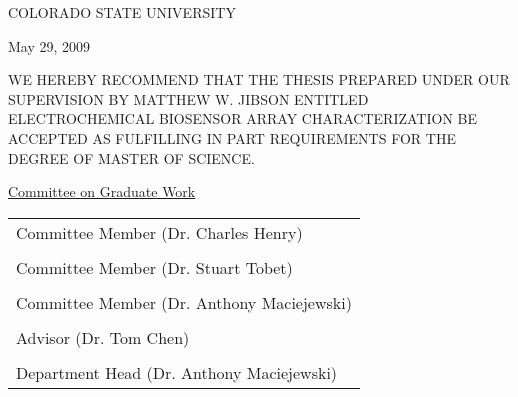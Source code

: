 \begin{center}
	COLORADO STATE UNIVERSITY
\end{center}

\vspace{0.5in}

\begin{flushright}
	May 29, 2009
\end{flushright}

WE HEREBY RECOMMEND THAT THE THESIS PREPARED UNDER OUR SUPERVISION BY MATTHEW W. JIBSON ENTITLED ELECTROCHEMICAL BIOSENSOR ARRAY CHARACTERIZATION BE ACCEPTED AS FULFILLING IN PART REQUIREMENTS FOR THE DEGREE OF MASTER OF SCIENCE.

\vspace{0.5in}

\begin{center}
	\underline{Committee on Graduate Work}\\

	\vspace{0.5in}

	\begin{tabular}{p{3in}}
		\\
		\hline Committee Member (Dr. Charles Henry)\\
		\\
		\hline Committee Member (Dr. Stuart Tobet)\\
		\\
		\hline Committee Member (Dr. Anthony Maciejewski)\\
		\\
		\hline Advisor (Dr. Tom Chen)\\
		\\
		\hline Department Head (Dr. Anthony Maciejewski)
	\end{tabular}
\end{center}
